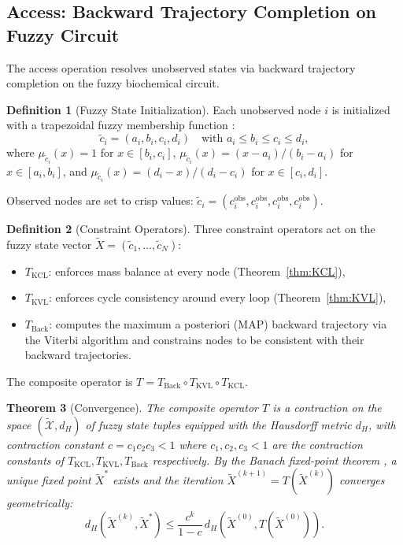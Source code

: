 \documentclass[twocolumn,10pt,a4paper]{article}
\newtheorem{theorem}{Theorem}[section]
\theoremstyle{definition}
\newtheorem{definition}[theorem]{Definition}
\theoremstyle{remark}
\begin{document}
\subsection{Access: Backward Trajectory Completion on Fuzzy Circuit}
\label{sec:access}

The access operation resolves unobserved states via backward trajectory completion on the fuzzy biochemical circuit.

\begin{definition}[Fuzzy State Initialization]
\label{def:fuzzy_init}
Each unobserved node $i$ is initialized with a trapezoidal fuzzy membership function \citep{Zadeh1965}:
\begin{equation}
    \tilde{c}_i = (a_i, b_i, c_i, d_i) \quad \text{with } a_i \leq b_i \leq c_i \leq d_i,
\end{equation}
where $\mu_{\tilde{c}_i}(x) = 1$ for $x \in [b_i, c_i]$, $\mu_{\tilde{c}_i}(x) = (x-a_i)/(b_i-a_i)$ for $x \in [a_i, b_i]$, and $\mu_{\tilde{c}_i}(x) = (d_i-x)/(d_i-c_i)$ for $x \in [c_i, d_i]$.

Observed nodes are set to crisp values: $\tilde{c}_i = (c_i^{\mathrm{obs}}, c_i^{\mathrm{obs}}, c_i^{\mathrm{obs}}, c_i^{\mathrm{obs}})$.
\end{definition}

\begin{definition}[Constraint Operators]
\label{def:constraint_ops}
Three constraint operators act on the fuzzy state vector $\tilde{X} = (\tilde{c}_1, \ldots, \tilde{c}_N)$:
\begin{itemize}[nosep]
    \item $T_{\mathrm{KCL}}$: enforces mass balance at every node (Theorem~\ref{thm:KCL}),
    \item $T_{\mathrm{KVL}}$: enforces cycle consistency around every loop (Theorem~\ref{thm:KVL}),
    \item $T_{\mathrm{Back}}$: computes the maximum a posteriori (MAP) backward trajectory via the Viterbi algorithm \citep{Viterbi1967} and constrains nodes to be consistent with their backward trajectories.
\end{itemize}
The composite operator is $T = T_{\mathrm{Back}} \circ T_{\mathrm{KVL}} \circ T_{\mathrm{KCL}}$.
\end{definition}

\begin{theorem}[Convergence]
\label{thm:convergence}
The composite operator $T$ is a contraction on the space $(\tilde{\mathcal{X}}, d_H)$ of fuzzy state tuples equipped with the Hausdorff metric $d_H$, with contraction constant $c = c_1 c_2 c_3 < 1$ where $c_1, c_2, c_3 < 1$ are the contraction constants of $T_{\mathrm{KCL}}, T_{\mathrm{KVL}}, T_{\mathrm{Back}}$ respectively. By the Banach fixed-point theorem \citep{Banach1922}, a unique fixed point $\tilde{X}^*$ exists and the iteration $\tilde{X}^{(k+1)} = T(\tilde{X}^{(k)})$ converges geometrically:
\begin{equation}
    d_H(\tilde{X}^{(k)}, \tilde{X}^*) \leq \frac{c^k}{1 - c} \, d_H(\tilde{X}^{(0)}, T(\tilde{X}^{(0)})).
    \label{eq:convergence}
\end{equation}
\end{theorem}
\end{document}
